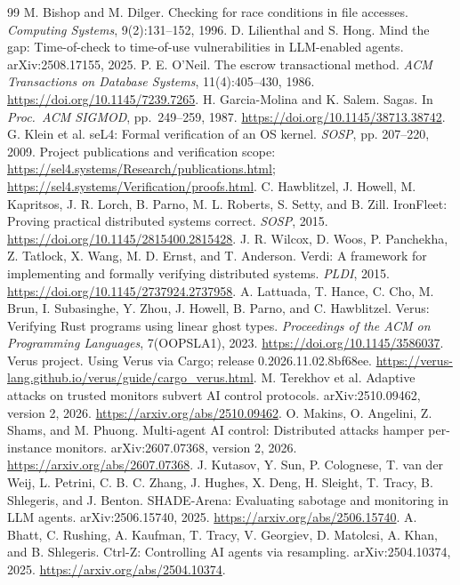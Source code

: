 \begin{thebibliography}{99}
 M. Bishop and M. Dilger. Checking for race conditions in file accesses. \emph{Computing Systems}, 9(2):131--152, 1996.
 D. Lilienthal and S. Hong. Mind the gap: Time-of-check to time-of-use vulnerabilities in LLM-enabled agents. arXiv:2508.17155, 2025.
 P. E. O'Neil. The escrow transactional method. \emph{ACM Transactions on Database Systems}, 11(4):405--430, 1986. \url{https://doi.org/10.1145/7239.7265}.
 H. Garcia-Molina and K. Salem. Sagas. In \emph{Proc.\ ACM SIGMOD}, pp.~249--259, 1987. \url{https://doi.org/10.1145/38713.38742}.
 G. Klein et al. seL4: Formal verification of an OS kernel. \emph{SOSP}, pp. 207--220, 2009. Project publications and verification scope: \url{https://sel4.systems/Research/publications.html}; \url{https://sel4.systems/Verification/proofs.html}.
 C. Hawblitzel, J. Howell, M. Kapritsos, J. R. Lorch, B. Parno, M. L. Roberts, S. Setty, and B. Zill. IronFleet: Proving practical distributed systems correct. \emph{SOSP}, 2015. \url{https://doi.org/10.1145/2815400.2815428}.
 J. R. Wilcox, D. Woos, P. Panchekha, Z. Tatlock, X. Wang, M. D. Ernst, and T. Anderson. Verdi: A framework for implementing and formally verifying distributed systems. \emph{PLDI}, 2015. \url{https://doi.org/10.1145/2737924.2737958}.
 A. Lattuada, T. Hance, C. Cho, M. Brun, I. Subasinghe, Y. Zhou, J. Howell, B. Parno, and C. Hawblitzel. Verus: Verifying Rust programs using linear ghost types. \emph{Proceedings of the ACM on Programming Languages}, 7(OOPSLA1), 2023. \url{https://doi.org/10.1145/3586037}.
 Verus project. Using Verus via Cargo; release 0.2026.11.02.8bf68ee. \url{https://verus-lang.github.io/verus/guide/cargo_verus.html}.
 M. Terekhov et al. Adaptive attacks on trusted monitors subvert AI control protocols. arXiv:2510.09462, version 2, 2026. \url{https://arxiv.org/abs/2510.09462}.
 O. Makins, O. Angelini, Z. Shams, and M. Phuong. Multi-agent AI control: Distributed attacks hamper per-instance monitors. arXiv:2607.07368, version 2, 2026. \url{https://arxiv.org/abs/2607.07368}.
 J. Kutasov, Y. Sun, P. Colognese, T. van der Weij, L. Petrini, C. B. C. Zhang, J. Hughes, X. Deng, H. Sleight, T. Tracy, B. Shlegeris, and J. Benton. SHADE-Arena: Evaluating sabotage and monitoring in LLM agents. arXiv:2506.15740, 2025. \url{https://arxiv.org/abs/2506.15740}.
 A. Bhatt, C. Rushing, A. Kaufman, T. Tracy, V. Georgiev, D. Matolcsi, A. Khan, and B. Shlegeris. Ctrl-Z: Controlling AI agents via resampling. arXiv:2504.10374, 2025. \url{https://arxiv.org/abs/2504.10374}.

\end{thebibliography}
